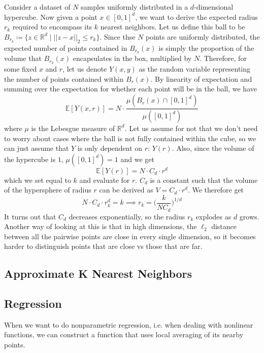   \begin{example}
    Consider a dataset of $N$ samples uniformly distributed in a $d$-dimensional hypercube. Now given a point $x \in [0, 1]^d$, we want to derive the expected radius $r_k$ required to encompass its $k$ nearest neighbors. Let us define this ball to be $B_{r_k} \coloneqq \{ z \in \mathbb{R}^d \mid ||z - x ||_2 \leq r_k \}$. Since thse $N$ points are uniformly distributed, the expected number of points contained in $B_{r_k} (x)$ is simply the proportion of the volume that $B_{r_k} (x)$ encapsulates in the box, multiplied by $N$. Therefore, for some fixed $x$ and $r$, let us denote $Y(x, y)$ as the random variable representing the number of points contained within $B_r (x)$. By linearity of expectation and summing over the expectation for whether each point will be in the ball, we have 
    \[\mathbb{E}[Y (x, r)] = N \cdot \frac{\mu(B_r (x) \cap [0, 1]^d) }{\mu([0, 1]^d)}\]
    where $\mu$ is the Lebesgue measure of $\mathbb{R}^d$. Let us assume for not that we don't need to worry about cases where the ball is not fully contained within the cube, so we can just assume that $Y$ is only dependent on $r$: $Y(r)$. Also, since the volume of the hypercube is $1$,  $\mu([0, 1]^d) = 1$ and we get 
    \[\mathbb{E}[Y(r)] = N \cdot C_d \cdot r^d\]
    which we set equal to $k$ and evaluate for $r$. $C_d$ is a constant such that the volume of the hypersphere of radius $r$ can be derived as $V = C_d \cdot r^d$. We therefore get 
    \[N \cdot C_d \cdot r_k^d = k \implies r_k = \bigg( \frac{k}{N C_d} \bigg)^{1/d}\]
    It turns out that $C_d$ decreases exponentially, so the radius $r_k$ explodes as $d$ grows. Another way of looking at this is that in high dimensions, the $\ell_2$ distance between all the pairwise points are close in every single dimension, so it becomes harder to distinguish points that are close vs those that are far.  
  \end{example} 

  \subsection{Approximate K Nearest Neighbors}

\subsection{Regression}

  When we want to do nonparametric regression, i.e. when dealing with nonlinear functions, we can construct a function that uses local averaging of its nearby points. 

